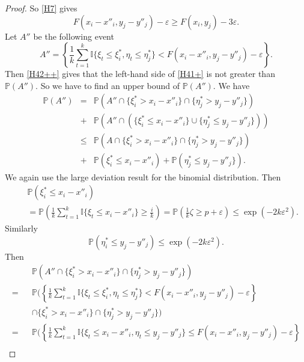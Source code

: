 \documentclass[12pt,twoside]{article}
\theoremstyle{definition}
\theoremstyle{remark}
\numberwithin{equation}{section}
\theoremstyle{plain}
\theoremstyle{remark}
\def\P{{\mathbb {P}}}                       \def\Q{{\mathbb {Q}}}
\def\I{{\mathbb {I}}}                       \def\M{{\mathbb {M}}}
\begin{document}
\begin{proof}
So \eqref{H7} gives
\begin{equation} \label{H42++}
F(x_i- x''_i, y_j-y''_j) -\varepsilon \ge F(x_i, y_j) - 3 \varepsilon .
\end{equation} 
Let $A''$ be the following event
\begin{equation} \label{H42+++}
A''=  \left\{\frac{1}{k} \sum_{t=1}^k \I\{ \xi_t \le \xi_i^\ast, \eta_t \le \eta_j^\ast \} 
< F(x_i- x''_i, y_j-y''_j) -\varepsilon  \right\} .
\end{equation} 
Then \eqref{H42++} gives that the left-hand side of \eqref{H41+} is not greater than $\P(A'')$.
So we have to find an upper bound of $\P(A'')$.
We have
\begin{eqnarray} \label{H43+}
\P(A'') &=& \P\left(A'' \cap \{ \xi^\ast_i >  x_i- x''_i  \} \cap 
\{ \eta^\ast_j >  y_j- y''_j  \} \right) \\
&+&\P\left(A'' \cap \left(\{ \xi^\ast_i \le  x_i- x''_i  \} 
\cup \{ \eta^\ast_j \le  y_j- y''_j  \} \right) \right) \nonumber \\
&\le&
\P\left(A \cap \{ \xi^\ast_i >  x_i- x''_i  \} \cap \{ \eta^\ast_j >  y_j- y''_j  \} \right) \nonumber \\
&+&\P\left(\xi^\ast_i \le  x_i- x''_i  \right) +
\P\left( \eta^\ast_j \le  y_j- y''_j  \} \right) . \nonumber 
\end{eqnarray}
%
We again use the large deviation result for the binomial distribution.
Then
\begin{eqnarray*}
&&\P\left(\xi^\ast_i \le  x_i- x''_i  \right) \\
&&=\P \left( \frac{1}{k} \sum_{t=1}^k \I\{ \xi_t \le x_i- x''_i\}  \ge \frac{i}{k} \right)
= \P\left(\frac{1}{k} \zeta \ge p+\varepsilon \right)
\le \exp (-2k \varepsilon^2 ) .
\end{eqnarray*}
Similarly 
$$
\P\left(\eta^\ast_i \le  y_j- y''_j  \right) 
\le \exp (-2k \varepsilon^2 ) .
$$
Then
\begin{eqnarray*} 
&& \P\left(A'' \cap \{ \xi^\ast_i >  x_i- x''_i \} \cap \{ \eta^\ast_j >  y_j- y''_j \} \right)  \\
 = &&
\P \Bigg( \left\{ \frac{1}{k} \sum\nolimits_{t=1}^k \I\{ \xi_t \le \xi_i^\ast, \eta_t \le \eta_j^\ast \} 
< F(x_i- x''_i, y_j-y''_j) -\varepsilon  \right\}     \\
&& \cap \{ \xi^\ast_i >  x_i- x''_i  \} \cap \{ \eta^\ast_j >  y_j- y''_j  \} \Bigg)  \\
=&&
\P \Bigg( \left\{ \frac{1}{k} \sum\nolimits_{t=1}^k 
\I\{ \xi_t \le x_i- x''_i, \eta_t \le y_j- y''_j \} 
\le  F(x_i- x''_i, y_j-y''_j) -\varepsilon  \right\}     \\

\end{eqnarray*}
\end{proof}
\end{document}
